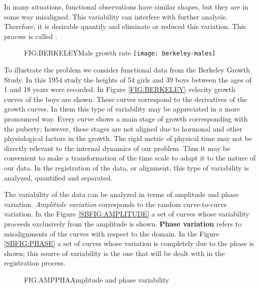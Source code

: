 In many situations, functional observations have
similar shapes, but they are in some way misaligned. This variability can
interfere with further analysis. Therefore, it is desirable quantify and
eliminate or reduced this variation. This process is called .


\begin{figure}[Male growth rate]{FIG:BERKELEY}{Male growth rate}
	\texttt{[image: berkeley-males]}
\end{figure}

To illustrate the problem we consider functional data from the Berkeley Growth
Study\cite{berkeley}. In this 1954 study the heights of 54
girls and 39 boys between the ages of 1 and 18 years were recorded. In Figure
\ref{FIG:BERKELEY} velocity growth curves of the boys are shown.
These curves correspond to the derivatives of the growth curves. In them this
type of variability may be appreciated in a more pronounced way.
Every curve shows a main stage of growth corresponding with the puberty;
however, these stages are not aligned due to hormonal and other
physiological factors in the growth. The rigid metric of physical time may not
be directly relevant to the internal dynamics of our problem. Thus it may be
convenient to make a transformation of the time scale to adapt it to the nature
of our data. In the registration of the data, or alignment, this type of
variability is analyzed, quantified and separated.


The variability of the data can be analyzed in terms of amplitude and
phase variation. \textit{Amplitude variation} corresponds to the
random curve-to-curve variation.
In the Figure \ref{SBFIG:AMPLITUDE} a
set of curves whose variability proceeds exclusively from the amplitude is shown.
\textbf{Phase variation} refers to
misalignments of the curves with respect to the
domain. In the Figure
\ref{SBFIG:PHASE} a set of curves whose variation is completely due
to the phase is shown; this source of variability is the one that will be dealt with in
the registration process.

\begin{figure}[Amplitude and phase variability]{FIG:AMPPHA}{Amplitude and phase variability}
   \quad
\end{figure}
